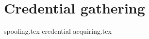 \documentclass{article}
\begin{document}
\section{Credential gathering}

{spoofing.tex}
{credential-acquiring.tex}
\end{document}
